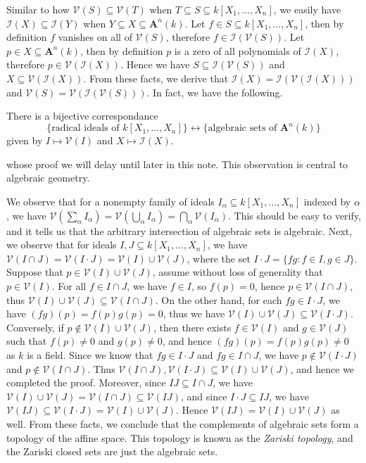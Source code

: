 \documentclass[11pt]{book}
\begin{document}
Similar to how $\mathcal{V}(S)\subseteq \mathcal{V}(T)$ when $T\subseteq S\subseteq k[X_1,\dots,X_n]$, we easily have $\mathcal{I}(X)\subseteq \mathcal{I}(Y)$ when $Y\subseteq X\subseteq \mathbf A^n(k)$. Let $f\in S\subseteq k[X_1,\dots,X_n]$, then by definition $f$ vanishes on all of $\mathcal{V}(S)$, therefore $f\in \mathcal{I}(\mathcal{V}(S))$. Let $p\in X\subseteq \mathbf A^n(k)$, then by definition $p$ is a zero of all polynomials of $\mathcal{I}(X)$, therefore $p\in \mathcal{V}(\mathcal{I}(X))$. Hence we have $S\subseteq \mathcal{I}(\mathcal{V}(S))$ and $X\subseteq \mathcal{V}(\mathcal{I}(X))$. From these facts, we derive that $\mathcal{I}(X)= \mathcal{I}(\mathcal{V}(\mathcal{I}(X)))$ and $\mathcal{V}(S)= \mathcal{V}(\mathcal{I}(\mathcal V(S)))$. In fact, we have the following.
\begin{theorembox}There is a bijective correspondance
\[\{\textrm{radical\ ideals\ of\ }k[X_1,\dots,X_n]\}\longleftrightarrow\{\textrm{algebraic\ sets\ of\ }\mathbf A^n(k)\}\]
given by $I\mapsto \mathcal{V}(I)$ and $X\mapsto \mathcal{I}(X)$.
\end{theorembox}
whose proof we will delay until later in this note. This observation is central to algebraic geometry. 

We observe that for a nonempty family of ideals $I_{\alpha}\subseteq k[X_1,\dots,X_n]$ indexed by $\alpha$, we have $\mathcal{V}(\sum_{\alpha}I_{\alpha})=\mathcal{V}(\bigcup_{\alpha}I_{\alpha})=\bigcap_{\alpha}\mathcal{V}(I_{\alpha})$. This should be easy to verify, and it tells us that the arbitrary intersection of algebraic sets is algebraic. Next, we observe that for ideals $I,J\subseteq k[X_1,\dots,X_n]$, we have $\mathcal{V}(I\cap J)=\mathcal{V}(I\cdot J)=\mathcal{V}(I)\cup \mathcal{V}(J)$, where the set $I\cdot J=\{fg:f\in I,g\in J\}$. Suppose that $p\in \mathcal{V}(I)\cup \mathcal{V}(J)$, assume without loss of generality that $p\in \mathcal{V}(I)$. For all $f\in I\cap J$, we have $f\in I$, so $f(p)=0$, hence $p\in \mathcal{V}(I\cap J)$, thus $\mathcal{V}(I)\cup\mathcal{V}(J)\subseteq \mathcal{V}(I\cap J)$. On the other hand, for each $fg\in I\cdot J$, we have $(fg)(p)=f(p)g(p)=0$, thus we have $\mathcal{V}(I)\cup\mathcal{V}(J)\subseteq \mathcal{V}(I\cdot J)$. Conversely, if $p\not\in \mathcal{V}(I)\cup \mathcal{V}(J)$, then there exists $f\in \mathcal{V}(I)$ and $g\in \mathcal{V}(J)$ such that $f(p)\ne 0$ and $g(p)\ne 0$, and hence $(fg)(p)=f(p)g(p)\ne 0$ as $k$ is a field. Since we know that $fg\in I\cdot J$ and $fg\in I\cap J$, we have $p\not\in \mathcal{V}(I\cdot J)$ and $p\not\in \mathcal{V}(I\cap J)$. Thus $\mathcal{V}(I\cap J),\mathcal{V}(I\cdot J)\subseteq \mathcal{V}(I)\cup\mathcal{V}(J)$, and hence we completed the proof. Moreover, since $IJ\subseteq I\cap J$, we have $\mathcal{V}(I)\cup\mathcal{V}(J)=\mathcal{V}(I\cap J)\subseteq\mathcal{V}(IJ)$, and since $I\cdot J\subseteq IJ$, we have $\mathcal{V}(IJ)\subseteq\mathcal{V}(I\cdot J)=\mathcal{V}(I)\cup\mathcal{V}(J)$. Hence $\mathcal{V}(IJ)=\mathcal{V}(I)\cup\mathcal{V}(J)$ as well. From these facts, we conclude that the complements of algebraic sets form a topology of the affine space. This topology is known as the \textit{Zariski topology}, and the Zariski closed sets are just the algebraic sets.
\end{document}
